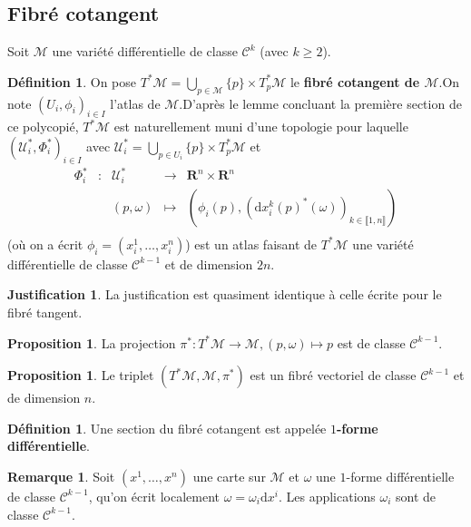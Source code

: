 \documentclass[12pt,a4paper]{article}
\theoremstyle{definition}
\newtheorem{prop}[thm]{Proposition}
\newtheorem{defn}[thm]{Définition}
\newtheorem{rqe}[thm]{Remarque}
\newtheorem*{just}{Justification}
\begin{document}
\subsection{Fibré cotangent}
Soit $\mathcal{M}$ une variété différentielle de classe $\mathcal{C}^k$ (avec $k\geqslant 2$).
\begin{defn}
On pose $\displaystyle T^*\mathcal{M}=\bigcup_{p\in\mathcal{M}}\{p\}\times T^*_p\mathcal{M}$ le \textbf{fibré cotangent de $\mathcal{M}$}.\newline On note $(U_i,\phi_i)_{i\in I}$ l'atlas de $\mathcal{M}$.\newline D'après le lemme concluant la première section de ce polycopié, $T^*\mathcal{M}$ est naturellement muni d'une topologie pour laquelle $(\mathcal{U}^*_i,\Phi^*_i)_{i\in I}$ avec $\mathcal{U}^*_i=\displaystyle\bigcup_{p\in U_i}\{p\}\times T^*_p\mathcal{M}$ et $$\begin{array}{ccccc}
\Phi^*_i & : & \mathcal{U}^*_i & \to & \mathbf{R}^{n}\times\mathbf{R}^n \\
 & & (p,\omega) & \mapsto & \left(\phi_i(p),\left(\mathrm{d}x_i^k(p)^*(\omega)\right)_{k\in\llbracket 1,n\rrbracket}\right) \\
\end{array}$$
(où on a écrit $\phi_i=(x_i^1,\ldots,x_i^n)$) est un atlas faisant de $T^*\mathcal{M}$ une variété différentielle de classe $\mathcal{C}^{k-1}$ et de dimension $2n$.
\end{defn}
\begin{just}
La justification est quasiment identique à celle écrite pour le fibré tangent.
\end{just}
\begin{prop}
La projection $\pi^*: T^*\mathcal{M}\to\mathcal{M},(p,\omega)\mapsto p$ est de classe $\mathcal{C}^{k-1}$.
\end{prop}
\begin{prop}
Le triplet $(T^*\mathcal{M},\mathcal{M},\pi^*)$ est un fibré vectoriel de classe $\mathcal{C}^{k-1}$ et de dimension $n$.
\end{prop}
\begin{defn}
Une section du fibré cotangent est appelée \textbf{$1$-forme différentielle}.
\end{defn}
\begin{rqe}
Soit $(x^1,\ldots,x^n)$ une carte sur $\mathcal{M}$ et $\omega$ une $1$-forme différentielle de classe $\mathcal{C}^{k-1}$, qu'on écrit localement $\omega=\omega_i\mathrm{d}x^i$. Les applications $\omega_i$ sont de classe $\mathcal{C}^{k-1}$.
\end{rqe}
\newpage
\end{document}
